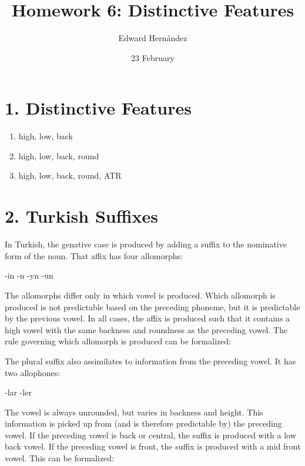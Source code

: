 \documentclass[doc,12pt]{apa6}
\begin{document}
\title{Homework 6: Distinctive Features}
\author{Edward Hern\'{a}ndez}
\date{23 February}
\maketitle

\section{1. Distinctive Features}
\begin{enumerate}
	\item high, low, back
	\item high, low, back, round
	\item high, low, back, round, ATR
\end{enumerate}

\section{2. Turkish Suffixes}

In Turkish, the genative case is produced by adding a suffix to the nominative
form of the noun. That affix has four allomorphs:
\begin{exe}
	\ex -in
	\ex -{\textbari}n
	\ex -yn
	\ex -un
\end{exe}
The allomorphs differ only in which vowel is produced. Which allomorph is
produced is not predictable based on the preceding phoneme, but it is
predictable by the previous vowel. In all cases, the affix is produced such
that it contains a high vowel with the same backness and roundness as the
preceding vowel.
The rule governing which allomorph is produced can be formalized: \\

The plural suffix also assimilates to information from the preceding vowel. It
has two allophones:
\begin{exe}
	\ex -lar
	\ex -ler
\end{exe}
The vowel is always unrounded, but varies in backness and height. This
information is picked up from (and is therefore predictable by) the preceding
vowel. If the preceding vowel is back or central, the suffix is produced with a
low back vowel. If the preceding vowel is front, the suffix is produced with a
mid front vowel.  This can be formalized: \\
\end{document}
